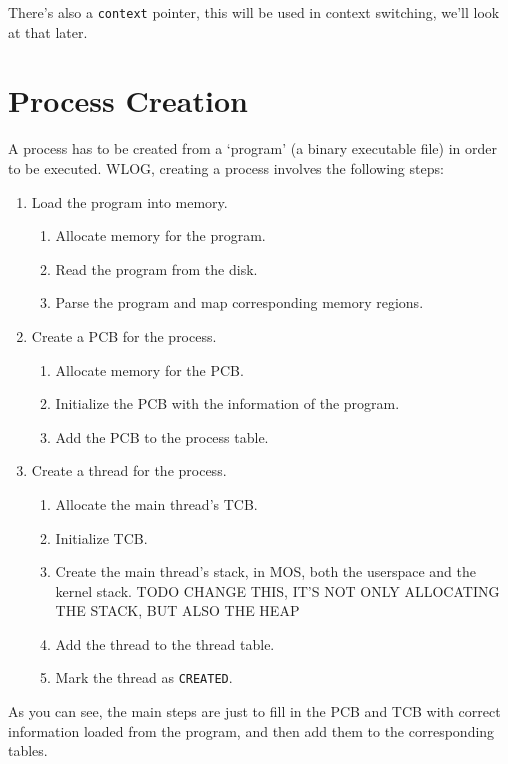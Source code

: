 There's also a \texttt{context} pointer, this will be used in context switching, we'll look at
that later.

\section{Process Creation}

A process has to be created from a `program' (a binary executable file) in order to be
executed. WLOG, creating a process involves the following steps:

\begin{enumerate}
    \item Load the program into memory.
          \begin{enumerate}
              \item Allocate memory for the program.
              \item Read the program from the disk.
              \item Parse the program and map corresponding memory regions.
          \end{enumerate}
    \item Create a PCB for the process.
          \begin{enumerate}
              \item Allocate memory for the PCB.
              \item Initialize the PCB with the information of the program.
              \item Add the PCB to the process table.
          \end{enumerate}
    \item Create a thread for the process.
          \begin{enumerate}
              \item Allocate the main thread's TCB.
              \item Initialize TCB.
              \item Create the main thread's stack, in MOS, both the userspace and the kernel stack.
                    TODO CHANGE THIS, IT'S NOT ONLY ALLOCATING THE STACK, BUT ALSO THE HEAP
              \item Add the thread to the thread table.
              \item Mark the thread as \texttt{CREATED}.
          \end{enumerate}
\end{enumerate}

As you can see, the main steps are just to fill in the PCB and TCB with correct information loaded
from the program, and then add them to the corresponding tables.

